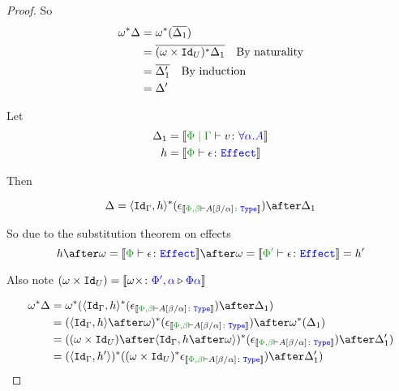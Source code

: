\documentclass{report}
\begin{document}
\begin{framed}
\begin{proof}
        So
        \begin{align*}
            \omega^*\Delta &= \omega^*(\overline{\Delta_1})\\
            & = \overline{(\omega\times\texttt{Id}_{U})^*\Delta_1}\quad\text{By naturality}\\
            & = \overline{\Delta_1'}\quad\text{By induction}\\
            & = \Delta'
        \end{align*}
        
        
        Let \begin{align*}
            \D_1 &= \deno{\gpetyperelation{v}{\all{\a}{A}}}\\
            h &= \deno{\typerelation{\P}{\e}{\effect}}\\
        \end{align*}
        
        Then
        
        \begin{equation}
            \D = \pr{\Id{\G}}{h}\star(\e_{\deno{\typerelation{\P,\b}{A\ssub{\a}{\b}}{\type}}})\after\D_1\\
        \end{equation}
        
        So due to the substitution theorem on effects
        \begin{equation}
            h\after\w = \deno{\typerelation{\P}{\e}{\effect}}\after\w = \deno{\typerelation{\P'}{\e}{\effect}} = h'
        \end{equation}
        
        Also note $(\omega\times\texttt{Id}_{U}) = {\bf [\![}\omega\times \colon {\color{blue}\Phi',\alpha} \triangleright {\color {blue} \Phi\alpha}{\bf ]\!]}$
        
        \begin{align*}
            \w\star{\D} & = \w\star(\pr{\Id{\G}}{h}\star(\e_{\deno{\typerelation{\P,\b}{A\ssub{\a}{\b}}{\type}}})\after\D_1)\\
            & = (\pr{\Id{\G}}{h}\after\w)\star(\e_{\deno{\typerelation{\P,\b}{A\ssub{\a}{\b}}{\type}}})\after\w\star(\D_1)\\
            & = ((\w\times\Id{U})\after\pr{\Id{\G}}{h\after\w})\star(\e_{\deno{\typerelation{\P,\b}{A\ssub{\a}{\b}}{\type}}})\after\D_1')\\
            & = (\pr{\Id{\G}}{h'})\star((\w\times\Id{U})\star\e_{\deno{\typerelation{\P,\b}{A\ssub{\a}{\b}}{\type}}})\after\D_1')\\
        \end{align*}
        

\end{proof}
\end{framed}
\end{document}
